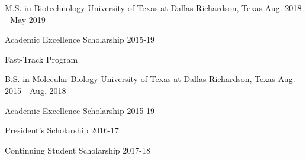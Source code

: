 

\begin{cventries}

  \cventry
    {M.S. in Biotechnology} %
    {University of Texas at Dallas} %
    {Richardson, Texas} %
    {Aug. 2018 - May 2019} %
    {
      \begin{cvitems} %
        \item {Academic Excellence Scholarship 2015-19}
        \item {Fast-Track Program}
      \end{cvitems}
    }

  \cventry
    {B.S. in Molecular Biology} %
    {University of Texas at Dallas} %
    {Richardson, Texas} %
    {Aug. 2015 - Aug. 2018} %
    {
      \begin{cvitems} %
        \item {Academic Excellence Scholarship 2015-19}
        \item {President's Scholarship 2016-17}
        \item {Continuing Student Scholarship 2017-18}
      \end{cvitems}
    }

\end{cventries}
